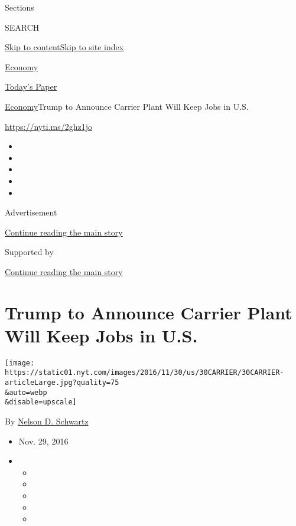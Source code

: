 Sections

SEARCH

\protect\hyperlink{site-content}{Skip to
content}\protect\hyperlink{site-index}{Skip to site index}

\href{https://www.nytimes.com/section/business/economy}{Economy}

\href{https://myaccount.nytimes.com/auth/login?response_type=cookie\&client_id=vi}{}

\href{https://www.nytimes.com/section/todayspaper}{Today's Paper}

\href{/section/business/economy}{Economy}\textbar{}Trump to Announce
Carrier Plant Will Keep Jobs in U.S.

\url{https://nyti.ms/2ghz1jo}

\begin{itemize}
\item
\item
\item
\item
\item
\end{itemize}

Advertisement

\protect\hyperlink{after-top}{Continue reading the main story}

Supported by

\protect\hyperlink{after-sponsor}{Continue reading the main story}

\hypertarget{trump-to-announce-carrier-plant-will-keep-jobs-in-us}{%
\section{Trump to Announce Carrier Plant Will Keep Jobs in
U.S.}\label{trump-to-announce-carrier-plant-will-keep-jobs-in-us}}

\texttt{[image: https://static01.nyt.com/images/2016/11/30/us/30CARRIER/30CARRIER-articleLarge.jpg?quality=75\\\&auto=webp\\\&disable=upscale]}

By \href{http://www.nytimes.com/by/nelson-d-schwartz}{Nelson D.
Schwartz}

\begin{itemize}
\item
  Nov. 29, 2016
\item
  \begin{itemize}
  \item
  \item
  \item
  \item
  \item
  \end{itemize}
\end{itemize}


